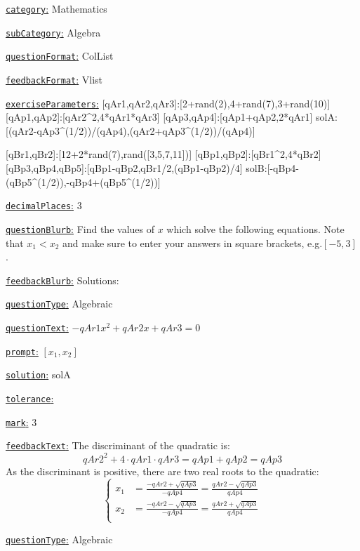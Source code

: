\documentclass[preview]{standalone}
\newcommand \fieldname[1]{\underline{\texttt{#1}:}}
\begin{document}
\fieldname{category}  %
Mathematics

\fieldname{subCategory} %
Algebra

\fieldname{questionFormat}
ColList

\fieldname{feedbackFormat}
Vlist


\fieldname{exerciseParameters}
[qAr1,qAr2,qAr3]:[2+rand(2),4+rand(7),3+rand(10)]
[qAp1,qAp2]:[qAr2^2,4*qAr1*qAr3]
[qAp3,qAp4]:[qAp1+qAp2,2*qAr1]
solA:[(qAr2-qAp3^(1/2))/(qAp4),(qAr2+qAp3^(1/2))/(qAp4)]

[qBr1,qBr2]:[12+2*rand(7),rand([3,5,7,11])]
[qBp1,qBp2]:[qBr1^2,4*qBr2]
[qBp3,qBp4,qBp5]:[qBp1-qBp2,qBr1/2,(qBp1-qBp2)/4]
solB:[-qBp4-(qBp5^(1/2)),-qBp4+(qBp5^(1/2))]

\fieldname{decimalPlaces}
3

\fieldname{questionBlurb}
Find the values of $x$ which solve the following equations. Note that $x_1 < x_2$ and make sure to enter your answers in square brackets, e.g.$[-5,3]$.

\fieldname{feedbackBlurb}
Solutions:

\fieldname{questionType}
Algebraic

\fieldname{questionText}
$-{qAr1}x^2 + {qAr2}x + {qAr3} = 0$

\fieldname{prompt}
$[x_1,x_2]$

\fieldname{solution}
solA

\fieldname{tolerance}


\fieldname{mark}
3

\fieldname{feedbackText}
The discriminant of the quadratic is:
\[
{qAr2}^2+4\cdot{qAr1}\cdot{qAr3} = {qAp1} + {qAp2} = {qAp3}
\]
As the discriminant is positive, there are two real roots to the quadratic:
\[
\left\{\begin{aligned}
x_1 & = \frac{-{qAr2}+\sqrt{{qAp3}}}{-{qAp4}} = \frac{{qAr2}-\sqrt{{qAp3}}}{{qAp4}}\\
x_2 & = \frac{-{qAr2}-\sqrt{{qAp3}}}{-{qAp4}} = \frac{{qAr2}+\sqrt{{qAp3}}}{{qAp4}}\\
\end{aligned}\right.
\]

\fieldname{questionType}
Algebraic
\end{document}
